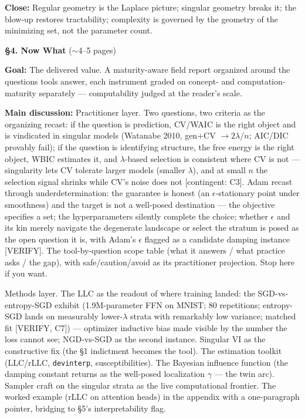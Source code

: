 \documentclass[11pt]{article}
\begin{document}
\textbf{Close:} Regular geometry is the Laplace picture; singular
geometry breaks it; the blow-up restores tractability; complexity is
governed by the geometry of the minimizing set, not the parameter
count.

\bigskip

\noindent\textbf{\S4. Now What} ($\sim$4--5 pages)

\textbf{Goal:} The delivered value. A maturity-aware field report
organized around the questions tools answer, each instrument graded on
concept- and computation-maturity separately --- computability judged at
the reader's scale.

\textbf{Main discussion:} Practitioner layer. Two questions, two
criteria as the organizing recast: if the question is prediction,
CV/WAIC is the right object and is vindicated in singular models
(Watanabe 2010, gen$+$CV $\to 2\lambda/n$; AIC/DIC provably fail); if
the question is identifying structure, the free energy is the right
object, WBIC estimates it, and $\lambda$-based selection is consistent
where CV is not --- singularity lets CV tolerate larger models (smaller
$\lambda$), and at small $n$ the selection signal shrinks while CV's
noise does not [contingent: C3]. Adam recast through underdetermination:
the guarantee is honest (an $\epsilon$-stationary point under
smoothness) and the target is not a well-posed destination --- the
objective specifies a set; the hyperparameters silently complete the
choice; whether $\epsilon$ and its kin merely navigate the degenerate
landscape or select the stratum is posed as the open question it is,
with Adam's $\epsilon$ flagged as a candidate damping instance
[VERIFY]. The tool-by-question scope table (what it answers / what
practice asks / the gap), with safe/caution/avoid as its practitioner
projection. Stop here if you want.

Methods layer. The LLC as the readout of where training landed: the
SGD-vs-entropy-SGD exhibit (1.9M-parameter FFN on MNIST; 80 repetitions;
entropy-SGD lands on measurably lower-$\lambda$ strata with remarkably
low variance; matched fit [VERIFY, C7]) --- optimizer inductive bias
made visible by the number the loss cannot see; NGD-vs-SGD as the second
instance. Singular VI as the constructive fix (the \S1 indictment
becomes the tool). The estimation toolkit (LLC/rLLC, \texttt{devinterp},
susceptibilities). The Bayesian influence function (the damping constant
returns as the well-posed localization $\gamma$ --- the twin arc).
Sampler craft on the singular strata as the live computational frontier.
The worked example (rLLC on attention heads) in the appendix with a
one-paragraph pointer, bridging to \S5's interpretability flag.
\end{document}

